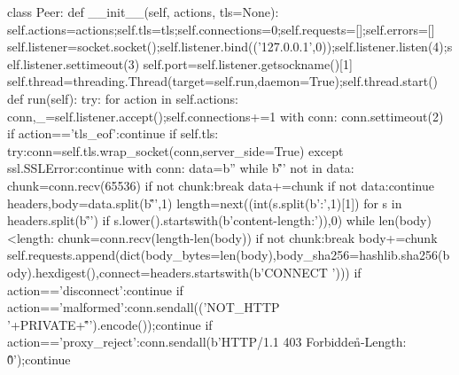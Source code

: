class Peer:
    def __init__(self, actions, tls=None):
        self.actions=actions;self.tls=tls;self.connections=0;self.requests=[];self.errors=[]
        self.listener=socket.socket();self.listener.bind(('127.0.0.1',0));self.listener.listen(4);self.listener.settimeout(3)
        self.port=self.listener.getsockname()[1]
        self.thread=threading.Thread(target=self.run,daemon=True);self.thread.start()
    def run(self):
        try:
            for action in self.actions:
                conn,_=self.listener.accept();self.connections+=1
                with conn:
                    conn.settimeout(2)
                    if action=='tls_eof':continue
                    if self.tls:
                        try:conn=self.tls.wrap_socket(conn,server_side=True)
                        except ssl.SSLError:continue
                    with conn:
                        data=b''
                        while b'\r\n\r\n' not in data:
                            chunk=conn.recv(65536)
                            if not chunk:break
                            data+=chunk
                        if not data:continue
                        headers,body=data.split(b'\r\n\r\n',1)
                        length=next((int(s.split(b':',1)[1]) for s in headers.split(b'\r\n') if s.lower().startswith(b'content-length:')),0)
                        while len(body)<length:
                            chunk=conn.recv(length-len(body))
                            if not chunk:break
                            body+=chunk
                        self.requests.append(dict(body_bytes=len(body),body_sha256=hashlib.sha256(body).hexdigest(),connect=headers.startswith(b'CONNECT ')))
                        if action=='disconnect':continue
                        if action=='malformed':conn.sendall(('NOT_HTTP '+PRIVATE+'\r\n\r\n').encode());continue
                        if action=='proxy_reject':conn.sendall(b'HTTP/1.1 403 Forbidden\r\nContent-Length: 0\r\n\r\n');continue
